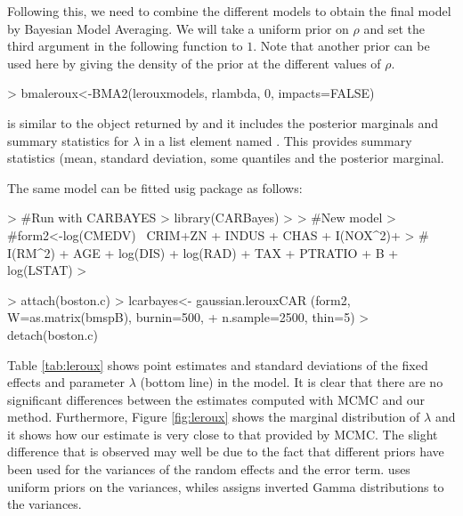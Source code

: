 \documentclass[article]{jss}
\begin{document}
Following this, we need to combine the different models to obtain the final
model by Bayesian Model Averaging. We will take a uniform prior on $\rho$ and
set the third argument in the following function to $1$. Note that another
prior can be used here by giving the density of the prior at the different
values of $\rho$.



\begin{Schunk}
\begin{Sinput}
> bmaleroux<-BMA2(lerouxmodels, rlambda, 0, impacts=FALSE)
\end{Sinput}
\end{Schunk}


\noindent
{} is similar to the object returned by  and it
includes the posterior marginals and summary statistics for $\lambda$
in a list element named . This provides summary statistics (mean,
standard deviation, some quantiles and the posterior marginal.

The same model can be fitted usig package  as follows:

\begin{Schunk}
\begin{Sinput}
> #Run with CARBAYES
> library(CARBayes)
> 
> #New model
> #form2<-log(CMEDV) ~CRIM+ZN + INDUS + CHAS + I(NOX^2)+
> #   I(RM^2) +  AGE + log(DIS) + log(RAD) + TAX + PTRATIO + B + log(LSTAT)
> 
\end{Sinput}
\end{Schunk}
\begin{Schunk}
\begin{Sinput}
> attach(boston.c)
> lcarbayes<- gaussian.lerouxCAR (form2, W=as.matrix(bmspB), burnin=500, 
+    n.sample=2500, thin=5)
> detach(boston.c)
\end{Sinput}
\end{Schunk}


Table \ref{tab:leroux} shows point estimates and standard deviations of the
fixed effects and parameter $\lambda$ (bottom line) in the model. It is clear
that there are no significant differences between the estimates computed with
MCMC and our method.  Furthermore, Figure \ref{fig:leroux} shows the marginal
distribution of $\lambda$ and it shows how our estimate is very close to that
provided by MCMC. The slight difference that is observed may well be due to the
fact that different priors have been used for the variances of the random
effects and the error term.  uses uniform priors on the variances,
whiles  assigns inverted Gamma distributions to the variances.
\end{document}
